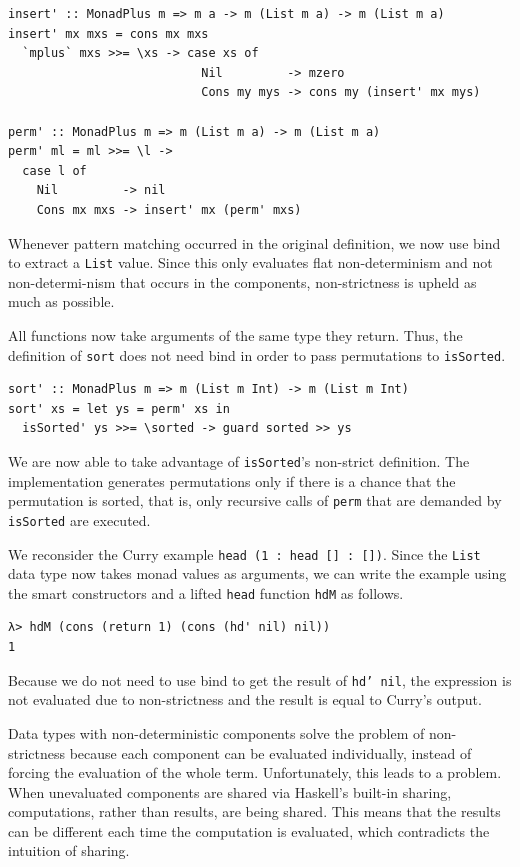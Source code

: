 \documentclass[a4paper, 11pt, fleqn, twoside, abstract=on]{scrreprt}
\newcommand{\hinl}[1]{\texttt{#1}}
\newcommand{\cinl}[1]{\texttt{#1}}
\begin{document}
\begin{verbatim}
insert' :: MonadPlus m => m a -> m (List m a) -> m (List m a)
insert' mx mxs = cons mx mxs
  `mplus` mxs >>= \xs -> case xs of
                           Nil         -> mzero
                           Cons my mys -> cons my (insert' mx mys)

perm' :: MonadPlus m => m (List m a) -> m (List m a)
perm' ml = ml >>= \l ->
  case l of
    Nil         -> nil
    Cons mx mxs -> insert' mx (perm' mxs)
\end{verbatim}

Whenever pattern matching occurred in the original definition, we now use bind to extract a \hinl{List} value.
Since this only evaluates flat non-determinism and not non-determi-nism that occurs in the components, non-strictness is upheld as much as possible.

All functions now take arguments of the same type they return.
Thus, the definition of \hinl{sort} does not need bind in order to pass permutations to \hinl{isSorted}.

\begin{verbatim}
sort' :: MonadPlus m => m (List m Int) -> m (List m Int)
sort' xs = let ys = perm' xs in
  isSorted' ys >>= \sorted -> guard sorted >> ys
\end{verbatim}

We are now able to take advantage of \hinl{isSorted}'s non-strict definition.
The implementation generates permutations only if there is a chance that the permutation is sorted, that is, only recursive calls of \hinl{perm} that are demanded by \hinl{isSorted} are executed.

We reconsider the Curry example \hinl{head (1 : head [] : [])}.
Since the \hinl{List} data type now takes monad values as arguments, we can write the example using the smart constructors and a lifted \hinl{head} function \cinl{hdM} as follows.

\begin{verbatim}
λ> hdM (cons (return 1) (cons (hd' nil) nil))
1
\end{verbatim}

Because we do not need to use bind to get the result of \hinl{hd' nil}, the expression is not evaluated due to non-strictness and the result is equal to Curry's output.

Data types with non-deterministic components solve the problem of non-strictness because each component can be evaluated individually, instead of forcing the evaluation of the whole term.
Unfortunately, this leads to a problem.
\label{sec:sharingComputations}
When unevaluated components are shared via Haskell's built-in sharing, computations, rather than results, are being shared.
This means that the results can be different each time the computation is evaluated, which contradicts the intuition of sharing.
\end{document}
